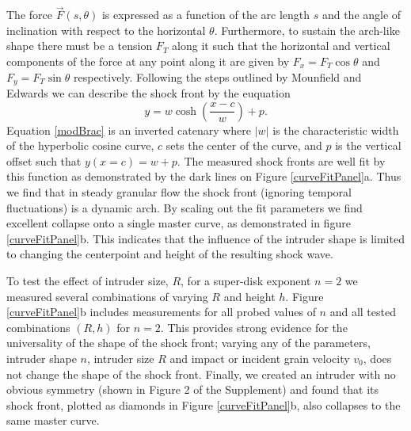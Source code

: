 The force $\vec{F}(s,\theta)$ is expressed as a function of the arc length $s$ and the angle of inclination with respect to the horizontal $\theta$. Furthermore, to sustain the arch-like shape there must be a tension $F_{T}$ along it such that the horizontal and vertical components of the force at any point along it are given by $F_{x}=F_{T}\cos{\theta}$ and $F_{y}=F_{T}\sin{\theta}$ respectively. Following the steps outlined by Mounfield and Edwards \cite{mounfield_theoretical_1996} we can describe the shock front by the euquation  
\begin{equation} 
y=w\cosh \left( \frac{x-c}{w} \right) +p.
\label{modBrac}
\end{equation}
Equation \ref{modBrac} is an inverted catenary where $|w|$ is the characteristic width of the hyperbolic cosine curve, $c$ sets the center of the curve, and $p$ is the vertical offset such that $y(x=c)=w+p$. The measured shock fronts are well fit by this function as demonstrated by the dark lines on Figure \ref{curveFitPanel}a. Thus we find that in steady granular flow the shock front (ignoring temporal fluctuations) is a dynamic arch. By scaling out the fit parameters we find excellent collapse onto a single master curve, as demonstrated in figure \ref{curveFitPanel}b. This indicates that the influence of the intruder shape is limited to changing the centerpoint and height of the resulting shock wave. 

To test the effect of intruder size, $R$, for a super-disk exponent $n=2$ we measured several combinations of varying $R$ and height $h$. Figure \ref{curveFitPanel}b includes measurements for all probed values of $n$ and all tested combinations $(R,h)$ for $n=2$. This provides strong evidence for the universality of the shape of the shock front; varying any of the parameters, intruder shape $n$, intruder size $R$ and impact or incident grain velocity $v_{0}$, does not change the shape of the shock front. Finally, we created an intruder with no obvious symmetry (shown in Figure 2 of the Supplement) and found that its shock front, plotted as diamonds in Figure \ref{curveFitPanel}b, also collapses to the same master curve.

